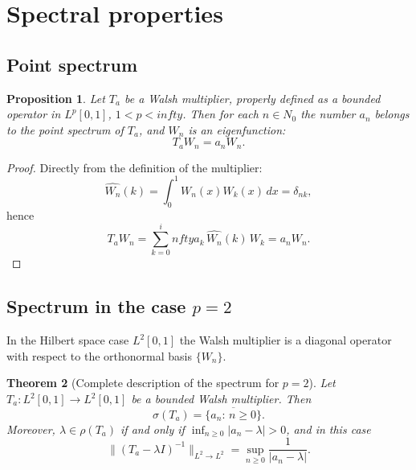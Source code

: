 \documentclass[a4paper,12pt]{article}
\newtheorem{theorem}{Theorem}[section]
\newtheorem{proposition}[theorem]{Proposition}
\theoremstyle{definition}
\theoremstyle{remark}
\theoremstyle{definition}
\newcommand{\Lp}{L^p[0,1]}
\newcommand{\Nzero}{\mathbb{N}_0}
\def\infty{infty}%
\def\mathbb#1{#1}%
\begin{document}
\section{Spectral properties}
\label{sec:spectral}

\subsection{Point spectrum}

\begin{proposition}
\label{prop:point}
Let $T_a$ be a Walsh multiplier, properly defined as a bounded operator in $\Lp$, $1<p<\infty$.
Then for each $n\in\Nzero$ the number $a_n$ belongs to the point spectrum of $T_a$,
and $W_n$ is an eigenfunction:
\[
T_aW_n=a_nW_n.
\]
\end{proposition}

\begin{proof}
Directly from the definition of the multiplier:
\[
\hat{W_n}(k)=\int_0^1 W_n(x)W_k(x)\,dx=\delta_{nk},
\]
hence
\[
T_aW_n=\sum_{k=0}^\infty a_k\,\hat{W_n}(k)\,W_k=a_nW_n.
\]
\end{proof}

\subsection{Spectrum in the case $p=2$}

In the Hilbert space case $L^2[0,1]$ the Walsh multiplier is a diagonal operator
with respect to the orthonormal basis $\{W_n\}$.

\begin{theorem}[Complete description of the spectrum for $p=2$]
\label{thm:spectrumL2}
Let $T_a:L^2[0,1]\to L^2[0,1]$ be a bounded Walsh multiplier.
Then
\[
\sigma(T_a)=\overline{\{a_n:\,n\ge 0\}}.
\]
Moreover, $\lambda\in\rho(T_a)$ if and only if $\inf_{n\ge0}|a_n-\lambda|>0$,
and in this case
\[
\|(T_a-\lambda I)^{-1}\|_{L^2\to L^2}=\sup_{n\ge0}\frac{1}{|a_n-\lambda|}.
\]
\end{theorem}
\end{document}
